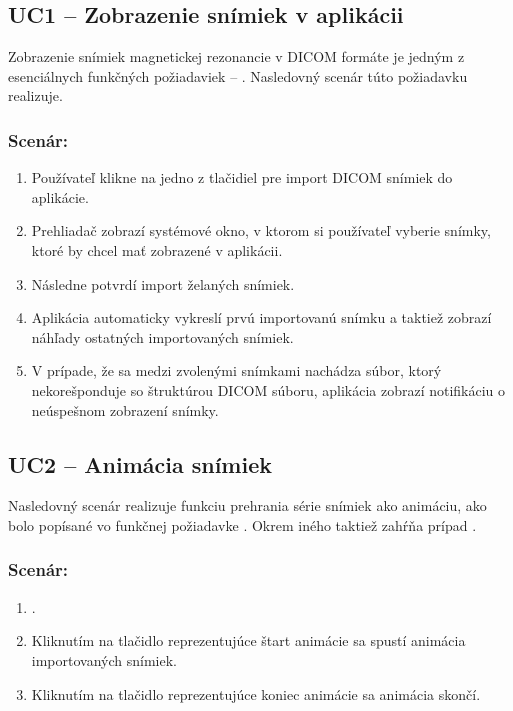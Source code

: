 \subsection {UC1 -- Zobrazenie snímiek v aplikácii}\label{uc1}
Zobrazenie snímiek magnetickej rezonancie v DICOM formáte je jedným z esenciálnych funkčných požiadaviek -- . Nasledovný scenár túto požiadavku realizuje.

\subsubsection*{Scenár:}
\begin {enumerate}
\item {Používateľ klikne na jedno z tlačidiel pre import DICOM snímiek do aplikácie.}
\item {Prehliadač zobrazí systémové okno, v ktorom si používateľ vyberie snímky, ktoré by chcel mať zobrazené v aplikácii.}
\item {Následne potvrdí import želaných snímiek.}
\item {Aplikácia automaticky vykreslí prvú importovanú snímku a taktiež zobrazí náhľady ostatných importovaných snímiek.}
\item {V prípade, že sa medzi zvolenými snímkami nachádza súbor, ktorý nekorešponduje so štruktúrou DICOM súboru, aplikácia zobrazí notifikáciu o neúspešnom zobrazení snímky.}
\end {enumerate}
	
\subsection {UC2 -- Animácia snímiek}\label{uc2}
Nasledovný scenár realizuje funkciu prehrania série snímiek ako animáciu, ako bolo popísané vo funkčnej požiadavke .
Okrem iného taktiež zahŕňa prípad . 

\subsubsection*{Scenár:}
\begin {enumerate}
\item {.}
\item {Kliknutím na tlačidlo reprezentujúce štart animácie sa spustí animácia importovaných snímiek.}
\item {Kliknutím na tlačidlo reprezentujúce koniec animácie sa animácia skončí.}
\end {enumerate}

